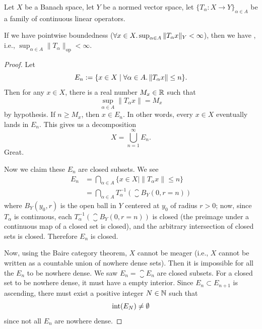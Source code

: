 \begin{theorem}
Let $X$ be a Banach space, let $Y$ be a normed vector space, let
$\{T_{\alpha}\colon X\to Y\}_{\alpha\in A}$ be a family of continuous
linear operators.

If we have pointwise boundedness ($\forall x\in X\ldotp\sup_{\alpha\in A}\|T_{\alpha}x\|_{Y}<\infty$),
then we have , i.e., $\sup_{\alpha\in A}\|T_{\alpha}\|_{\text{op}}<\infty$.
\end{theorem}

\begin{proof}
Let
\begin{equation}
E_{n}:=\{x\in X\mid\forall\alpha\in A\ldotp\|T_{\alpha}x\|\leq n\}.
\end{equation}
Then for any $x\in X$, there is a real number $M_{x}\in\mathbb{R}$ such that
\begin{equation}
\sup_{\alpha\in A}\|T_{\alpha}x\|=M_{x}
\end{equation}
by hypothesis. If $n\geq M_{x}$, then $x\in E_{n}$. In other words,
every $x\in X$ eventually lands in $E_{n}$. This gives us a decomposition
\begin{equation}
X=\bigcup_{n=1}^{\infty}E_{n}.
\end{equation}
Great.

Now we claim these $E_{n}$ are closed subsets. We see
\begin{subequations}
  \begin{align}
E_{n} &= \bigcap_{\alpha\in A}\{x\in X\mid \|T_{\alpha}x\|\leq n\}\\
&=\bigcap_{\alpha\in A}T_{\alpha}^{-1}(\closure{B_{Y}(0,r=n)})
  \end{align}
\end{subequations}
where $B_{Y}(y_{0},r)$ is the open ball in $Y$ centered at $y_{0}$ of
radius $r>0$; now, since $T_{\alpha}$ is continuous, each
$T_{\alpha}^{-1}(\closure{B_{Y}(0,r=n)})$ is closed (the preimage
under a continuous map of a closed set is closed), and the arbitrary
intersection of closed sets is closed. Therefore $E_{n}$ is closed.

Now, using the Baire category theorem, $X$ cannot be meager (i.e., $X$
cannot be written as a countable union of nowhere dense sets). Then it
is impossible for all the $E_{n}$ to be nowhere dense. We saw
$E_{n}=\closure{E_{n}}$ are closed subsets. For a closed set to be
nowhere dense, it must have a empty interior. Since $E_{n}\subset E_{n+1}$
is ascending, there must exist a positive integer $N\in\mathbb{N}$ such that
\begin{equation}
\operatorname{int}(E_{N})\neq\emptyset
\end{equation}
since not all $E_{n}$ are nowhere dense.


\end{proof}
